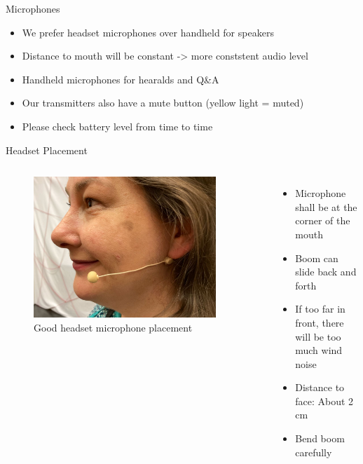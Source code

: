 
\begin{frame}{Microphones}
	\begin{itemize}
		\item We prefer headset microphones over handheld for speakers
		\item Distance to mouth will be constant -> more conststent audio level
		\item Handheld microphones for hearalds and Q\&A
		\item Our transmitters also have a mute button (yellow light = muted)
		\item Please check battery level from time to time
	\end{itemize}
\end{frame}

\begin{frame}{Headset Placement}
	\begin{columns}[T,onlytextwidth]
		\begin{figure} 
			\centering
			\includegraphics[width=0.9\textwidth]{images/headset-side.jpeg}
			\caption{Good headset microphone placement}
		\end{figure}
		\begin{itemize}
			\item Microphone shall be at the corner of the mouth
			\item Boom can slide back and forth
			\item If too far in front, there will be too much wind noise
			\item Distance to face: About 2 cm
			\item Bend boom carefully
		\end{itemize}
	\end{columns}
\end{frame}
